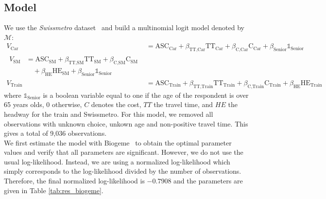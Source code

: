 \documentclass[conference]{IEEEtran}
\begin{document}
\subsection{Model}
\label{sec:model}

We use the {\it Swissmetro} dataset~\cite{bierlaire_acceptance_2001} and build a multinomial logit model denoted by $\mathcal{M}$:
\begin{align}
\label{eq:model}
V_{\text{Car}} &= \text{ASC}_{\text{Car}} + \beta_{\text{TT,Car}} \text{TT}_{\text{Car}} + \beta_{\text{C,Car}} \text{C}_{\text{Car}} + \beta_{\text{Senior}}\mathbb{1}_{\text{Senior}} \nonumber \\
\begin{split}
V_{\text{SM}} &= \text{ASC}_{\text{SM}} + \beta_{\text{TT,SM}} \text{TT}_{\text{SM}} + \beta_{\text{C,SM}} \text{C}_{\text{SM}} \\
& \quad + \beta_{\text{HE}} \text{HE}_{\text{SM}} + \beta_{\text{Senior}}\mathbb{1}_{\text{Senior}}
\end{split} \\
V_{\text{Train}} &= \text{ASC}_{\text{Train}} + \beta_{\text{TT,Train}} \text{TT}_{\text{Train}} + \beta_{\text{C,Train}} \text{C}_{\text{Train}} + \beta_{\text{HE}} \text{HE}_{\text{Train}} \nonumber
\end{align}
where $\mathbb{1}_{\text{Senior}}$ is a boolean variable equal to one if the age of the respondent is over 65 years olds, 0 otherwise, $C$ denotes the cost, $TT$ the travel time, and $HE$ the headway for the train and Swissmetro. For this model, we removed all observations with unknown choice, unkown age and non-positive travel time. This gives a total of 9,036 observations.\\
 
We first estimate the model with Biogeme~\cite{bierlaire_biogeme:_2003} to obtain the optimal parameter values and verify that all parameters are significant. However, we do not use the usual log-likelihood. Instead, we are using a normalized log-likelihood which simply corresponds to the log-likelihood divided by the number of observations. Therefore, the final normalized log-likelihood is $-0.7908$ and the parameters are given in Table \ref{tab:res_biogeme}.\\
\end{document}
